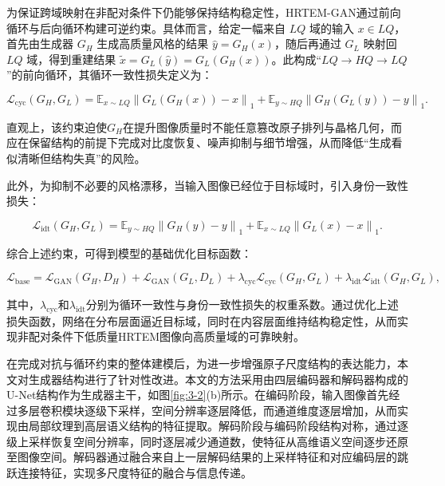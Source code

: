 为保证跨域映射在非配对条件下仍能够保持结构稳定性，HRTEM-GAN通过前向循环与后向循环构建可逆约束。具体而言，给定一幅来自 $LQ$ 域的输入 $x \in LQ$，首先由生成器 $G_H$ 生成高质量风格的结果 $\hat{y} = G_H(x)$，随后再通过 $G_L$ 映射回 $LQ$ 域，得到重建结果 $\tilde{x} = G_L(\hat{y}) = G_L(G_H(x))$。此构成“$LQ \rightarrow HQ \rightarrow LQ$”的前向循环，其循环一致性损失定义为：

\begin{equation}
\mathcal{L}_{\mathrm{cyc}}(G_H,G_L) =
\mathbb{E}_{x \sim LQ}
\left\|
G_L(G_H(x)) - x
\right\|_{1}
+
\mathbb{E}_{y \sim HQ}
\left\|
G_H(G_L(y)) - y
\right\|_{1}.
\end{equation}

直观上，该约束迫使$G_H$在提升图像质量时不能任意篡改原子排列与晶格几何，而应在保留结构的前提下完成对比度恢复、噪声抑制与细节增强，从而降低“生成看似清晰但结构失真”的风险。

此外，为抑制不必要的风格漂移，当输入图像已经位于目标域时，引入身份一致性损失：

\begin{equation}
\mathcal{L}_{\mathrm{idt}}(G_H,G_L) =
\mathbb{E}_{y \sim HQ}
\left\|
G_H(y) - y
\right\|_{1}
+
\mathbb{E}_{x \sim LQ}
\left\|
G_L(x) - x
\right\|_{1}.
\end{equation}

综合上述约束，可得到模型的基础优化目标函数：

\begin{equation}
\label{eq:03:01}
\mathcal{L}_{\text{base}} = 
\mathcal{L}_{\mathrm{GAN}}(G_H, D_H)
+ 
\mathcal{L}_{\mathrm{GAN}}(G_L, D_L)
+ 
\lambda_{\mathrm{cyc}} \mathcal{L}_{\mathrm{cyc}}(G_H, G_L)
+ 
\lambda_{\mathrm{idt}} \mathcal{L}_{\mathrm{idt}}(G_H, G_L),
\end{equation}

其中，$\lambda_{\mathrm{cyc}}$和$\lambda_{\mathrm{idt}}$分别为循环一致性与身份一致性损失的权重系数。通过优化上述损失函数，网络在分布层面逼近目标域，同时在内容层面维持结构稳定性，从而实现非配对条件下低质量HRTEM图像向高质量域的可靠映射。

在完成对抗与循环约束的整体建模后，为进一步增强原子尺度结构的表达能力，本文对生成器结构进行了针对性改进。本文的方法采用由四层编码器和解码器构成的U-Net结构作为生成器主干，如图\ref{fig:3-2}(b)所示。在编码阶段，输入图像首先经过多层卷积模块逐级下采样，空间分辨率逐层降低，而通道维度逐层增加，从而实现由局部纹理到高层语义结构的特征提取。解码阶段与编码阶段结构对称，通过逐级上采样恢复空间分辨率，同时逐层减少通道数，使特征从高维语义空间逐步还原至图像空间。解码器通过融合来自上一层解码结果的上采样特征和对应编码层的跳跃连接特征，实现多尺度特征的融合与信息传递。

